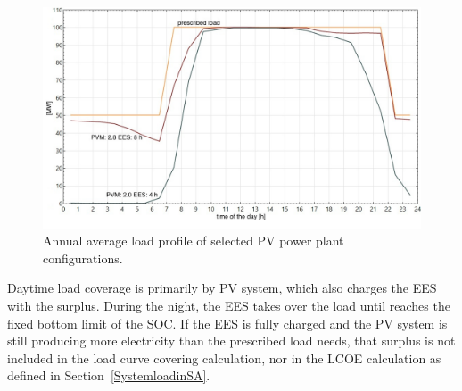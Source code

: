 \begin{figure}[htbp]  
\centering
\includegraphics[width=0.9\linewidth]{FIG/PV_annual_profil}
\caption[Annual average load profile of selected PV power plant configurations.]{Annual average load profile of selected PV power plant configurations.}\label{PV_annual_profil}
\end{figure}


Daytime load coverage is primarily by \ac{PV} system, which also charges the \ac{EES} with the surplus. During the night, the \ac{EES} takes over the load until reaches the fixed bottom limit of the \ac{SOC}. If the \ac{EES} is fully charged and the \ac{PV} system is still producing more electricity than the prescribed load needs, that surplus is not included in the load curve covering calculation, nor in the \ac{LCOE} calculation as defined in Section~\ref{SystemloadinSA}. 
\pagebreak


